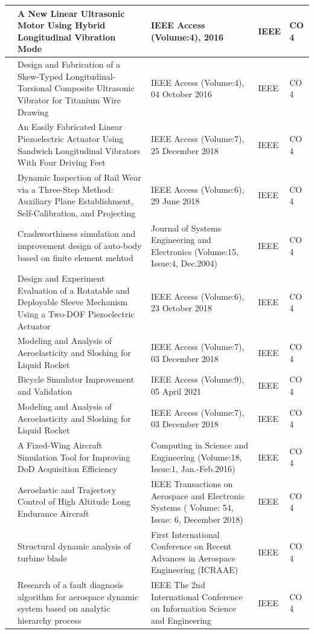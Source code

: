 \documentclass[11pt,paper=a4,answers]{exam}
\begin{document}
\begin{flushleft}
\begin{longtable}{|>{\centering\arraybackslash}p{1.4cm}  |  >{\raggedright\arraybackslash}p{6cm} |>{\centering\arraybackslash}p{3.75cm}|>{\centering\arraybackslash}p{2cm} |>{\centering\arraybackslash}p{2cm} |}
146&A New Linear Ultrasonic Motor Using Hybrid Longitudinal Vibration Mode&IEEE Access (Volume:4), 2016&IEEE&CO 4\\\hline
147&Design and Fabrication of a Skew-Typed Longitudinal-Torsional Composite Ultrasonic Vibrator for Titanium Wire Drawing&IEEE Access (Volume:4), 04 October 2016&IEEE&CO 4\\\hline
148&An Easily Fabricated Linear Piezoelectric Actuator Using Sandwich Longitudinal Vibrators With Four Driving Feet&IEEE Access (Volume:7), 25 December 2018&IEEE&CO 4\\\hline
149&Dynamic Inspection of Rail Wear via a Three-Step Method: Auxiliary Plane Establishment, Self-Calibration, and Projecting&IEEE Access (Volume:6), 29 June 2018&IEEE&CO 4\\\hline
150&Crashworthiness simulation and improvement design of auto-body based on finite element mehtod&Journal of Systems Engineering and Electronics (Volume:15, Issue:4, Dec.2004)&IEEE&CO 4\\\hline
151&Design and Experiment Evaluation of a Rotatable and Deployable Sleeve Mechanism Using a Two-DOF Piezoelectric Actuator&IEEE Access (Volume:6), 23 October 2018&IEEE&CO 4\\\hline
152&Modeling and Analysis of Aeroelasticity and Sloshing for Liquid Rocket&IEEE Access (Volume:7),  03 December 2018&IEEE&CO 4\\\hline
153&Bicycle Simulator Improvement and Validation&IEEE Access (Volume:9),  05 April 2021&IEEE&CO 4\\\hline
154&Modeling and Analysis of Aeroelasticity and Sloshing for Liquid Rocket&IEEE Access (Volume:7), 03 December 2018&IEEE&CO 4\\\hline
155&A Fixed-Wing Aircraft Simulation Tool for Improving DoD Acquisition Efficiency&Computing in Science and Engineering (Volume:18, Issue:1, Jan.-Feb.2016)&IEEE&CO 4\\\hline
156&Aeroelastic and Trajectory Control of High Altitude Long Endurance Aircraft& IEEE Transactions on Aerospace and Electronic Systems ( Volume: 54, Issue: 6, December 2018)&IEEE&CO 4\\\hline
157&Structural dynamic analysis of turbine blade&2025 First International Conference on Recent Advances in Aerospace Engineering (ICRAAE)&IEEE&CO 4\\\hline
158&Research of a fault diagnosis algorithm for aerospace dynamic system based on analytic hierarchy process&IEEE The 2nd International Conference on Information Science and Engineering&IEEE&CO 4\\\hline

\end{longtable}
\end{flushleft}
\end{document}
